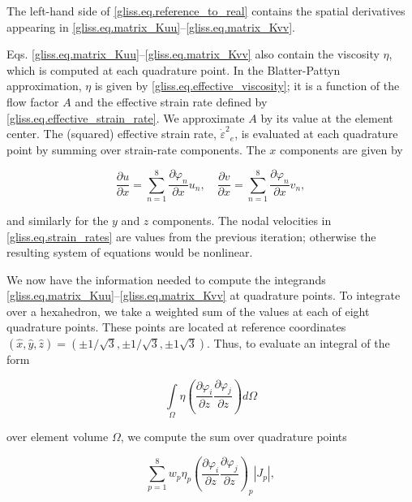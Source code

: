 \noindent
The left-hand side of \eqref{gliss.eq.reference_to_real} contains the spatial derivatives 
appearing in \eqref{gliss.eq.matrix_Kuu}--\eqref{gliss.eq.matrix_Kvv}.

Eqs. \eqref{gliss.eq.matrix_Kuu}--\eqref{gliss.eq.matrix_Kvv} also contain the viscosity $\eta$,
which is computed at each quadrature point.
In the Blatter-Pattyn approximation, $\eta$ is given by \eqref{gliss.eq.effective_viscosity};
it is a function of the flow factor $A$ and the effective strain rate defined by \eqref{gliss.eq.effective_strain_rate}.
We approximate $A$ by its value at the element center.
The (squared) effective strain rate, ${{\dot{\varepsilon }}^{2}}_{e}$, is evaluated at each quadrature point
by summing over strain-rate components.  The $x$ components are given by

\begin{equation}
  \label{gliss.eq.strain_rates}
  \frac{\partial u}{\partial x}=\sum\limits_{n=1}^{8}{\frac{\partial {{\varphi }_{n}}}{\partial x}}{{u}_{n}}, \quad
  \frac{\partial v}{\partial x}=\sum\limits_{n=1}^{8}{\frac{\partial {{\varphi }_{n}}}{\partial x}}{{v}_{n}},
\end{equation}

\noindent
and similarly for the $y$ and $z$ components.  The nodal velocities in \eqref{gliss.eq.strain_rates}
are values from the previous iteration; otherwise the resulting system of equations would be nonlinear.

We now have the information needed to compute the integrands \eqref{gliss.eq.matrix_Kuu}--\eqref{gliss.eq.matrix_Kvv}
at quadrature points. To integrate over a hexahedron, we take a weighted sum of the values at each
of eight quadrature points.  These points are located at
reference coordinates $(\hat{x},\hat{y},\hat{z}) = (\pm 1/\sqrt{3}, \pm 1/\sqrt{3}, \pm 1\sqrt{3})$.
Thus, to evaluate an integral of the form

\begin{equation}
  \int\limits_{\Omega }{\eta \left( \frac{\partial {{\varphi }_{i}}}{\partial z}\frac{\partial {{\varphi }_{j}}}{\partial z} \right)}d\Omega
\end{equation}

\noindent
over element volume $\Omega$, we compute the sum over quadrature points

\begin{equation}
  \label{gliss.eq.sum_over_qp}
  \sum\limits_{p=1}^{8}{{{w}_{p}}{{\eta }_{p}}{{\left( \frac{\partial {{\varphi }_{i}}}{\partial z}\frac{\partial {{\varphi }_{j}}}{\partial z} \right)}_{p}}}|J_p|,
\end{equation}

